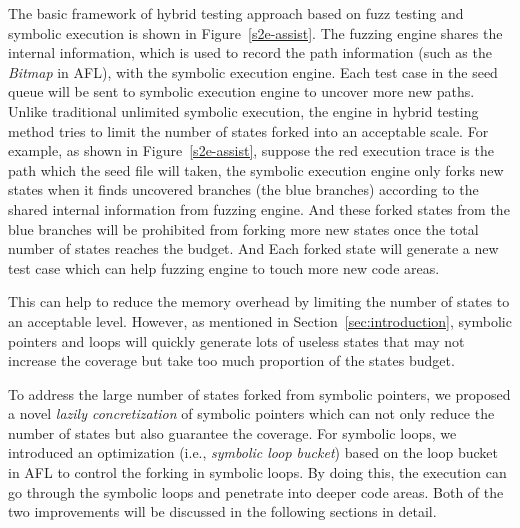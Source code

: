 The basic framework of hybrid testing approach based on fuzz testing and symbolic execution is shown in Figure~\ref{s2e-assist}. The fuzzing engine shares the internal information, which is used to record the path information (such as the \textit{Bitmap} in AFL), with the symbolic execution engine. 
Each test case in the seed queue will be sent to symbolic execution engine to uncover more new paths. 
Unlike traditional unlimited symbolic execution, the engine in hybrid testing method tries to limit the number of states forked into an acceptable scale. For example, as shown in Figure~\ref{s2e-assist}, suppose the red execution trace is the path which the seed file will taken, the symbolic execution engine only forks new states when it finds uncovered branches (the blue branches) according to the shared internal information from fuzzing engine. And these forked states from the blue branches will be prohibited from forking more new states once the total number of states reaches the budget. And Each forked state will generate a new test case which can help fuzzing engine to touch more new code areas. 

This can help to reduce the memory overhead by limiting the number of states to an acceptable level. However, as mentioned in Section~\ref{sec:introduction}, symbolic pointers and loops will quickly generate lots of useless states that may not increase the coverage but take too much proportion of the states budget.

To address the large number of states forked from symbolic pointers, we proposed a novel \textit{lazily concretization} of symbolic pointers which can not only reduce the number of states but also guarantee the coverage. 
For symbolic loops, we introduced an optimization (i.e., \textit{symbolic loop bucket}) based on the loop bucket in AFL to control the forking in symbolic loops. By doing this, the execution can go through the symbolic loops and penetrate into deeper code areas.
Both of the two improvements will be discussed in the following sections in detail.

